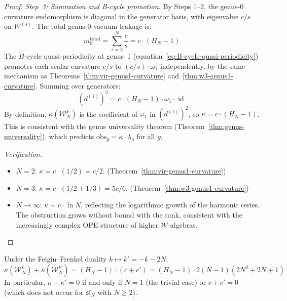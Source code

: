 \begin{proof}
\emph{Step~3: Summation and B-cycle promotion.}
By Steps 1--2, the genus-0 curvature endomorphism is diagonal in the
generator basis, with eigenvalue $c/s$ on $W^{(s)}$.  The total
genus-0 vacuum leakage is:
\begin{equation}
m_0^{\mathrm{total}} = \sum_{s=2}^{N} \frac{c}{s}
= c \cdot (H_N - 1)
\end{equation}
The $B$-cycle quasi-periodicity at genus~1
(equation~\eqref{eq:B-cycle-quasi-periodicity}) promotes each
scalar curvature $c/s$ to $(c/s) \cdot \omega_1$ independently, by
the same mechanism as
Theorems~\ref{thm:vir-genus1-curvature}
and~\ref{thm:w3-genus1-curvature}.  Summing over generators:
\begin{equation}
(d^{(1)})^2 = c \cdot (H_N - 1) \cdot \omega_1 \cdot \operatorname{id}
\end{equation}
By definition, $\kappa(\mathcal{W}_N^k)$ is the coefficient of
$\omega_1$ in $(d^{(1)})^2$, so
$\kappa = c \cdot (H_N - 1)$.  This is consistent with the
genus universality theorem
(Theorem~\ref{thm:genus-universality}), which predicts
$\mathrm{obs}_g = \kappa \cdot \lambda_g$ for all $g$.

\emph{Verification.}
\begin{itemize}
\item $N = 2$: $\kappa = c \cdot (1/2) = c/2$.  \checkmark
  (Theorem~\ref{thm:vir-genus1-curvature})
\item $N = 3$: $\kappa = c \cdot (1/2 + 1/3) = 5c/6$.  \checkmark
  (Theorem~\ref{thm:w3-genus1-curvature})
\item $N \to \infty$: $\kappa \sim c \cdot \ln N$, reflecting the
  logarithmic growth of the harmonic series.  The obstruction
  grows without bound with the rank, consistent with the
  increasingly complex OPE structure of higher $\mathcal{W}$-algebras.
\end{itemize}
\end{proof}

\begin{corollary}
\label{cor:wn-complementarity}
Under the Feigin--Frenkel duality $k \mapsto k' = -k - 2N$:
\begin{equation}\label{eq:wn-kappa-sum}
\kappa(\mathcal{W}_N^k) + \kappa(\mathcal{W}_N^{k'})
= (H_N - 1) \cdot (c + c')
= (H_N - 1) \cdot 2(N{-}1)(2N^2{+}2N{+}1)
\end{equation}
In particular, $\kappa + \kappa' = 0$ if and only if $N = 1$
(the trivial case) or $c + c' = 0$ (which does not occur for
$\mathfrak{sl}_N$ with $N \geq 2$).
\end{corollary}


